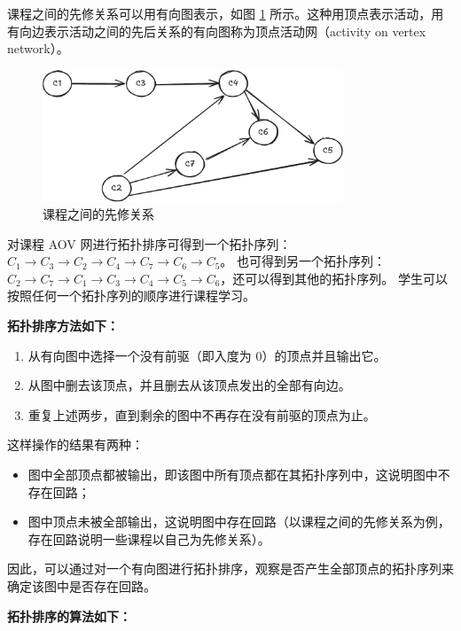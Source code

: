 \documentclass[lang=cn,newtx,10pt,scheme=chinese]{../elegantbook}
\begin{document}
课程之间的先修关系可以用有向图表示，如图 \ref{fig:course} 所示。这种用顶点表示活动，用有向边表示活动之间的先后关系的有向图称为顶点活动网（activity on vertex network）。

\begin{figure}[h!]
  \centering
  \includegraphics[width=0.8\textwidth]{./figure/pdf/cropped/toposort.pdf}
  \caption{课程之间的先修关系}
  \label{fig:course}
\end{figure}

对课程 AOV 网进行拓扑排序可得到一个拓扑序列：$C_1 \to C_3 \to C_2 \to C_4 \to C_7 \to C_6 \to C_5$。  
也可得到另一个拓扑序列：$C_2 \to C_7 \to C_1 \to C_3 \to C_4 \to C_5 \to C_6$，还可以得到其他的拓扑序列。  
学生可以按照任何一个拓扑序列的顺序进行课程学习。

\textbf{拓扑排序方法如下：}

\begin{enumerate}
  \item 从有向图中选择一个没有前驱（即入度为 $0$）的顶点并且输出它。
  \item 从图中删去该顶点，并且删去从该顶点发出的全部有向边。
  \item 重复上述两步，直到剩余的图中不再存在没有前驱的顶点为止。
\end{enumerate}

这样操作的结果有两种：
\begin{itemize}
  \item 图中全部顶点都被输出，即该图中所有顶点都在其拓扑序列中，这说明图中不存在回路；
  \item 图中顶点未被全部输出，这说明图中存在回路（以课程之间的先修关系为例，存在回路说明一些课程以自己为先修关系）。
\end{itemize}

因此，可以通过对一个有向图进行拓扑排序，观察是否产生全部顶点的拓扑序列来确定该图中是否存在回路。

\textbf{拓扑排序的算法如下：}
\end{document}
